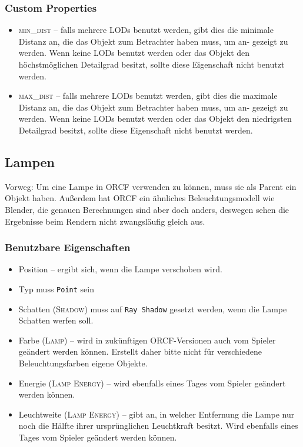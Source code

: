 \documentclass[a4paper]{article}
\newcommand{\ccaption}[1]{\textsc{#1}}
\newcommand{\cvalue}[1]{\texttt{#1}}
\newcommand{\rarrow}{\textrightarrow}
\begin{document}
\subsubsection{Custom Properties}
\begin{itemize}
\item \ccaption{min\_dist} -- falls mehrere LODs benutzt werden, gibt dies die minimale Distanz an, die das Objekt zum Betrachter haben muss, um an-
  gezeigt zu werden. Wenn keine LODs benutzt werden oder das Objekt den höchstmöglichen Detailgrad besitzt, sollte diese Eigenschaft nicht benutzt
  werden.
\item \ccaption{max\_dist} -- falls mehrere LODs benutzt werden, gibt dies die maximale Distanz an, die das Objekt zum Betrachter haben muss, um an-
  gezeigt zu werden. Wenn keine LODs benutzt werden oder das Objekt den niedrigsten Detailgrad besitzt, sollte diese Eigenschaft nicht benutzt
  werden.
\end{itemize}

\subsection{Lampen}
Vorweg: Um eine Lampe in ORCF verwenden zu können, muss sie als Parent ein Objekt haben. Außerdem hat ORCF ein ähnliches Beleuchtungsmodell wie
Blender, die genauen Berechnungen sind aber doch anders, deswegen sehen die Ergebnisse beim Rendern nicht zwangsläufig gleich aus.

\subsubsection{Benutzbare Eigenschaften}
\begin{itemize}
\item Position -- ergibt sich, wenn die Lampe verschoben wird.
\item Typ muss \cvalue{Point} sein
\item Schatten (\ccaption{Shadow}) muss auf \cvalue{Ray Shadow} gesetzt werden, wenn die Lampe Schatten werfen soll.
\item Farbe (\ccaption{Lamp}) -- wird in zukünftigen ORCF-Versionen auch vom Spieler geändert werden können. Erstellt daher bitte nicht für verschiedene
  Beleuchtungsfarben eigene Objekte.
\item Energie (\ccaption{Lamp \rarrow Energy}) -- wird ebenfalls eines Tages vom Spieler geändert werden können.
\item Leuchtweite (\ccaption{Lamp \rarrow Energy}) -- gibt an, in welcher Entfernung die Lampe nur noch die Hälfte ihrer ursprünglichen Leuchtkraft
  besitzt. Wird ebenfalls eines Tages vom Spieler geändert werden können.
\end{itemize}
\end{document}
